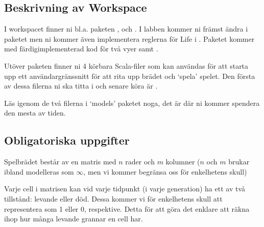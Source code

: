 \subsection{Beskrivning av Workspace}

I workspacet finner ni bl.a. paketen ,  och . I labben kommer ni främst ändra i  paketet men ni kommer även implementera reglerna för Life i . Paketet  kommer med färdigimplementerad kod för två vyer  samt .

Utöver paketen finner ni 4 körbara Scala-filer som kan användas för att starta upp ett användargränssnitt för att rita upp brädet och `spela' spelet. Den första av dessa filerna ni ska titta i och senare köra är .

Läs igenom de två filerna i `models' paketet noga, det är där ni kommer spendera den mesta av tiden.


\subsection{Obligatoriska uppgifter}


    
	Spelbrädet består av en matris med $n$ rader och $m$ kolumner ($n$ och $m$ brukar ibland modelleras som $\infty$, men vi kommer begränsa oss för enkelhetens skull)

	Varje cell i matrisen kan vid varje tidpunkt (i varje generation) ha ett av två tillstånd: levande eller död. Dessa kommer vi för enkelhetens skull att representera som 1 eller 0, respektive. Detta för att göra det enklare att räkna ihop hur många levande grannar en cell har.

